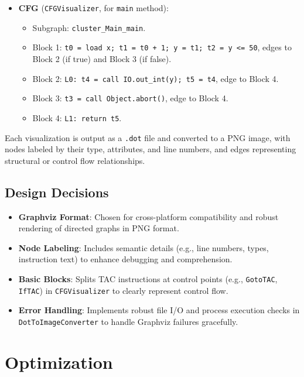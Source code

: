 \documentclass[11pt, titlepage]{article}
\begin{document}
\begin{itemize}[leftmargin=*]
\begin{itemize}
        \end{itemize}
    \item \textbf{CFG} (\texttt{CFGVisualizer}, for \texttt{main} method):
        \begin{itemize}
            \item Subgraph: \texttt{cluster\_Main\_main}.
            \item Block 1: \texttt{t0 = load x; t1 = t0 + 1; y = t1; t2 = y <= 50}, edges to Block 2 (if true) and Block 3 (if false).
            \item Block 2: \texttt{L0: t4 = call IO.out\_int(y); t5 = t4}, edge to Block 4.
            \item Block 3: \texttt{t3 = call Object.abort()}, edge to Block 4.
            \item Block 4: \texttt{L1: return t5}.
        \end{itemize}
\end{itemize}

Each visualization is output as a \texttt{.dot} file and converted to a PNG image, with nodes labeled by their type, attributes, and line numbers, and edges representing structural or control flow relationships.

\subsection{Design Decisions}
\begin{itemize}[leftmargin=*]
    \item \textbf{Graphviz Format}: Chosen for cross-platform compatibility and robust rendering of directed graphs in PNG format.
    \item \textbf{Node Labeling}: Includes semantic details (e.g., line numbers, types, instruction text) to enhance debugging and comprehension.
    \item \textbf{Basic Blocks}: Splits TAC instructions at control points (e.g., \texttt{GotoTAC}, \texttt{IfTAC}) in \texttt{CFGVisualizer} to clearly represent control flow.
    \item \textbf{Error Handling}: Implements robust file I/O and process execution checks in \texttt{DotToImageConverter} to handle Graphviz failures gracefully.
\end{itemize}

\section{Optimization}
\label{sec:optimization}
\end{document}
